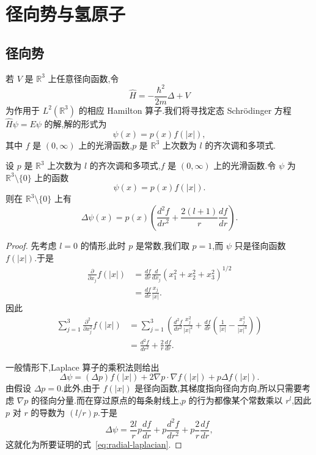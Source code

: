 \chapter{径向势与氢原子}
\label{chap:radial-hydrogen}

\section{径向势}
\label{sec:radial-potentials}

若 $V$ 是 $\mathbb R^3$ 上任意径向函数,令
\[
 \widehat H=-\frac{\hbar^2}{2m}\Delta+V
\]
为作用于 $L^2(\mathbb R^3)$ 的相应 Hamilton 算子.我们将寻找定态 Schrödinger 方程 $\widehat H\psi=E\psi$ 的解,解的形式为
\[
 \psi(x)=p(x)f(|x|),
\]
其中 $f$ 是 $(0,\infty)$ 上的光滑函数,$p$ 是 $\mathbb R^3$ 上次数为 $l$ 的齐次调和多项式.

\begin{proposition}\label{prop:radial-laplacian}
设 $p$ 是 $\mathbb R^3$ 上次数为 $l$ 的齐次调和多项式,$f$ 是 $(0,\infty)$ 上的光滑函数.令 $\psi$ 为 $\mathbb R^3\setminus\{0\}$ 上的函数
\[
 \psi(x)=p(x)f(|x|).
\label{eq:radial-laplacian-function}
\]
则在 $\mathbb R^3\setminus\{0\}$ 上有
\[
 \Delta\psi(x)=p(x)\left(\frac{d^2f}{dr^2}+\frac{2(l+1)}r\frac{df}{dr}\right).
\label{eq:radial-laplacian}
\]
\end{proposition}

\begin{proof}
先考虑 $l=0$ 的情形,此时 $p$ 是常数,我们取 $p=1$,而 $\psi$ 只是径向函数 $f(|x|)$.于是
\[
\begin{aligned}
 \frac{\partial}{\partial x_j}f(|x|)
 &=\frac{df}{dr}\frac{d}{dx_j}(x_1^2+x_2^2+x_3^2)^{1/2}\\
 &=\frac{df}{dr}\frac{x_j}{|x|}.
\end{aligned}
\]
因此
\[
\begin{aligned}
 \sum_{j=1}^3\frac{\partial^2}{\partial x_j^2}f(|x|)
 &=\sum_{j=1}^3\left(\frac{d^2f}{dr^2}\frac{x_j^2}{|x|^2}
 +\frac{df}{dr}\left(\frac1{|x|}-\frac{x_j^2}{|x|^3}\right)\right)\\
 &=\frac{d^2f}{dr^2}+\frac2r\frac{df}{dr}.
\end{aligned}
\]

一般情形下,Laplace 算子的乘积法则给出
\[
 \Delta\psi=(\Delta p)f(|x|)+2\nabla p\cdot\nabla f(|x|)+p\Delta f(|x|).
\]
由假设 $\Delta p=0$.此外,由于 $f(|x|)$ 是径向函数,其梯度指向径向方向,所以只需要考虑 $\nabla p$ 的径向分量.而在穿过原点的每条射线上,$p$ 的行为都像某个常数乘以 $r^l$,因此 $p$ 对 $r$ 的导数为 $(l/r)p$.于是
\[
 \Delta\psi=\frac{2l}{r}p\frac{df}{dr}+p\frac{d^2f}{dr^2}+p\frac2r\frac{df}{dr},
\]
这就化为所要证明的式~\eqref{eq:radial-laplacian}.
\end{proof}

